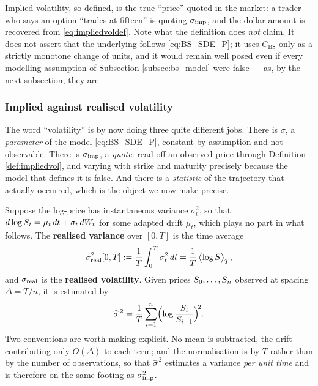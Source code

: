 Implied volatility, so defined, is the true ``price'' quoted in the market: a trader who says an
option ``trades at fifteen'' is quoting $\sigma_{\mathrm{imp}}$, and the dollar amount is recovered from
\eqref{eq:impliedvoldef}. Note what the definition does \emph{not} claim. It does not assert that the
underlying follows \eqref{eq:BS_SDE_P}; it uses $C_{\mathrm{BS}}$ only as a strictly monotone change
of units, and it would remain well posed even if every modelling assumption of Subsection
\ref{subsec:bs_model} were false --- as, by the next subsection, they are.

\subsubsection*{Implied against realised volatility}

The word ``volatility'' is by now doing three quite different jobs. There is $\sigma$,
a \emph{parameter} of the model \eqref{eq:BS_SDE_P}, constant by assumption and not observable.
There is $\sigma_{\mathrm{imp}}$, a \emph{quote}: read off an observed price through Definition
\ref{def:impliedvol}, and varying with strike and maturity precisely because the model that defines
it is false. And there is a \emph{statistic} of the trajectory that actually occurred, which is the
object we now make precise.

\begin{definition}\label{def:realisedvol}
Suppose the log-price has instantaneous variance $\sigma_t^2$, so that
$d\log S_t = \mu_t\,dt + \sigma_t\,dW_t$ for some adapted drift $\mu_t$, which plays no part in
what follows. The \textbf{realised variance} over $[0,T]$ is the
time average
\begin{equation}\label{eq:realisedvariance}
\sigma_{\mathrm{real}}^2[0,T] := \frac{1}{T}\int_0^T \sigma_t^2\,dt = \frac{1}{T}\,\bigl\langle \log S \bigr\rangle_T ,
\end{equation}
and $\sigma_{\mathrm{real}}$ is the \textbf{realised volatility}. Given prices $S_0,\dots,S_n$ observed at
spacing $\Delta = T/n$, it is estimated by
\begin{equation}\label{eq:realisedestimator}
\widehat{\sigma}^{\,2} = \frac{1}{T}\sum_{i=1}^{n}\Bigl(\log\frac{S_i}{S_{i-1}}\Bigr)^{\!2} .
\end{equation}
Two conventions are worth making explicit. No mean is subtracted, the drift contributing only
$O(\Delta)$ to each term; and the normalisation is by $T$ rather than by the number of observations,
so that $\widehat{\sigma}^{\,2}$ estimates a variance \emph{per unit time} and is therefore on the
same footing as $\sigma_{\mathrm{imp}}^{2}$.
\end{definition}


